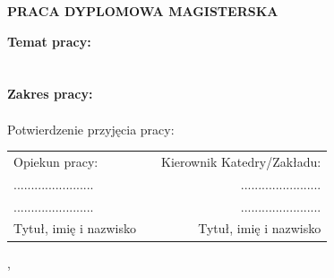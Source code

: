 {  \begin{center}
    \vspace{1cm}
    \Large{\textbf{\uppercase{Praca dyplomowa magisterska}}}
  \end{center}
  \vspace{1cm}
	
		\noindent\textbf{Temat pracy:} \\
		\@title\\
		\\
		\noindent\textbf{Zakres pracy:} \\
		\@descr\\
		
		\vspace{2.5cm}
		\noindent{}Potwierdzenie przyjęcia pracy:
		\vspace{1cm}
		
		\noindent
		\begin{tabular}{@{}lp{6cm}r@{}}
			Opiekun pracy: & & Kierownik Katedry/Zakładu: \\ 
			....................... & & ....................... \\
			....................... & & ....................... \\
			Tytuł, imię i nazwisko & & Tytuł, imię i nazwisko \\
		\end{tabular}
		
		\begin{center}
			\@miasto, \@date
		\end{center}
	
	\pagebreak
	\addtolength{\hoffset}{0.5cm}
	\addtolength{\voffset}{1.5cm}
	\addtolength{\textwidth}{-0.5cm}
}

\makeatother


